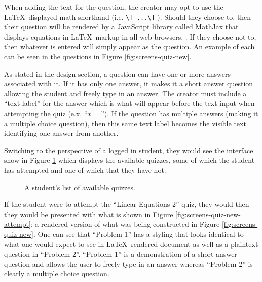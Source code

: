 When adding the text for the question, the creator may opt to use the \LaTeX\ displayed math shorthand (i.e. \texttt{\textbackslash [ ...\textbackslash ]} ). Should they choose to, then their question will be rendered by a JavaScript library called MathJax that displays equations in \LaTeX\ markup in all web browsers. \cite{mathjax-webpage}. If they choose not to, then whatever is entered will simply appear as the question. An example of each can be seen in the questions in Figure \ref{fig:screens-quiz-new}.

As stated in the design section, a question can have one or more answers associated with it. If it has only one answer, it makes it a short answer question allowing the student and freely type in an answer. The creator must include a ``text label'' for the answer which is what will appear before the text input when attempting the quiz (e.x. ``$x = $''). If the question has multiple answers (making it a multiple choice question), then this same text label becomes the visible text identifying one answer from another.

Switching to the perspective of a logged in student, they would see the interface show in Figure \ref{fig:screens-quiz-list-student} which displays the available quizzes, some of which the student has attempted and one of which that they have not.

\begin{figure}[h!]
	\centering
	\caption{A student's list of available quizzes.}
	\label{fig:screens-quiz-list-student}
\end{figure}

If the student were to attempt the ``Linear Equations 2'' quiz, they would then they would be presented with what is shown in Figure \ref{fig:screens-quiz-new-attempt}; a rendered version of what was being constructed in Figure \ref{fig:screens-quiz-new}. One can see that ``Problem 1'' has a styling that looks identical to what one would expect to see in \LaTeX\ rendered document as well as a plaintext question in ``Problem 2''. ``Problem 1'' is a demonstration of a short answer question and allows the user to freely type in an answer whereas ``Problem 2'' is clearly a multiple choice question.


